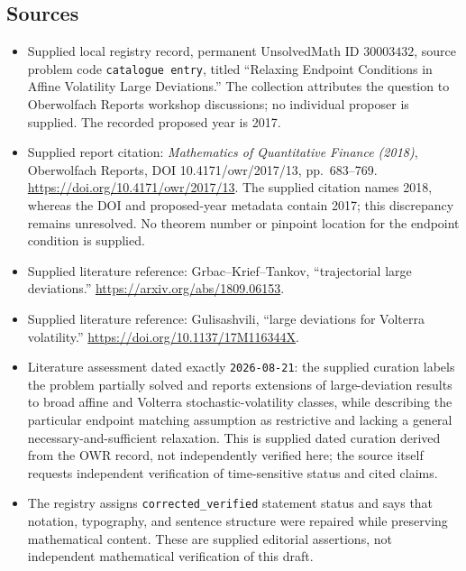\documentclass[11pt]{article}
\begin{document}
\subsection{Sources}
\begin{itemize}
\item Supplied local registry record, permanent UnsolvedMath ID \(30003432\), source problem code \texttt{catalogue entry}, titled ``Relaxing Endpoint Conditions in Affine Volatility Large Deviations.'' The collection attributes the question to Oberwolfach Reports workshop discussions; no individual proposer is supplied. The recorded proposed year is 2017.
\item Supplied report citation: \emph{Mathematics of Quantitative Finance (2018)}, Oberwolfach Reports, DOI 10.4171/owr/2017/13, pp.\ 683--769. \url{https://doi.org/10.4171/owr/2017/13}. The supplied citation names 2018, whereas the DOI and proposed-year metadata contain 2017; this discrepancy remains unresolved. No theorem number or pinpoint location for the endpoint condition is supplied.
\item Supplied literature reference: Grbac--Krief--Tankov, ``trajectorial large deviations.'' \url{https://arxiv.org/abs/1809.06153}.
\item Supplied literature reference: Gulisashvili, ``large deviations for Volterra volatility.'' \url{https://doi.org/10.1137/17M116344X}.
\item Literature assessment dated exactly \texttt{2026-08-21}: the supplied curation labels the problem partially solved and reports extensions of large-deviation results to broad affine and Volterra stochastic-volatility classes, while describing the particular endpoint matching assumption as restrictive and lacking a general necessary-and-sufficient relaxation. This is supplied dated curation derived from the OWR record, not independently verified here; the source itself requests independent verification of time-sensitive status and cited claims.
\item The registry assigns \texttt{corrected\_verified} statement status and says that notation, typography, and sentence structure were repaired while preserving mathematical content. These are supplied editorial assertions, not independent mathematical verification of this draft.
\end{itemize}
\end{document}
